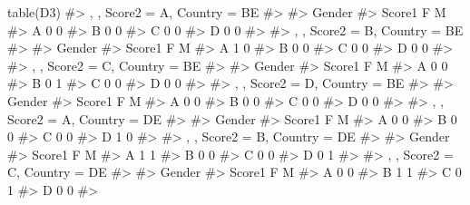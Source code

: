 \documentclass[
  letterpaper,
  DIV=11,
  numbers=noendperiod]{scrreprt}
\newenvironment{Shaded}{\begin{snugshade}}{\end{snugshade}}
\newcommand{\CommentTok}[1]{\textcolor[rgb]{0.37,0.37,0.37}{#1}}
\newcommand{\FunctionTok}[1]{\textcolor[rgb]{0.28,0.35,0.67}{#1}}
\newcommand{\NormalTok}[1]{\textcolor[rgb]{0.00,0.23,0.31}{#1}}
\begin{document}
\begin{Shaded}
\begin{Highlighting}[]
\FunctionTok{table}\NormalTok{(D3)}
\CommentTok{\#\textgreater{} , , Score2 = A, Country = BE}
\CommentTok{\#\textgreater{} }
\CommentTok{\#\textgreater{}       Gender}
\CommentTok{\#\textgreater{} Score1 F M}
\CommentTok{\#\textgreater{}      A 0 0}
\CommentTok{\#\textgreater{}      B 0 0}
\CommentTok{\#\textgreater{}      C 0 0}
\CommentTok{\#\textgreater{}      D 0 0}
\CommentTok{\#\textgreater{} }
\CommentTok{\#\textgreater{} , , Score2 = B, Country = BE}
\CommentTok{\#\textgreater{} }
\CommentTok{\#\textgreater{}       Gender}
\CommentTok{\#\textgreater{} Score1 F M}
\CommentTok{\#\textgreater{}      A 1 0}
\CommentTok{\#\textgreater{}      B 0 0}
\CommentTok{\#\textgreater{}      C 0 0}
\CommentTok{\#\textgreater{}      D 0 0}
\CommentTok{\#\textgreater{} }
\CommentTok{\#\textgreater{} , , Score2 = C, Country = BE}
\CommentTok{\#\textgreater{} }
\CommentTok{\#\textgreater{}       Gender}
\CommentTok{\#\textgreater{} Score1 F M}
\CommentTok{\#\textgreater{}      A 0 0}
\CommentTok{\#\textgreater{}      B 0 1}
\CommentTok{\#\textgreater{}      C 0 0}
\CommentTok{\#\textgreater{}      D 0 0}
\CommentTok{\#\textgreater{} }
\CommentTok{\#\textgreater{} , , Score2 = D, Country = BE}
\CommentTok{\#\textgreater{} }
\CommentTok{\#\textgreater{}       Gender}
\CommentTok{\#\textgreater{} Score1 F M}
\CommentTok{\#\textgreater{}      A 0 0}
\CommentTok{\#\textgreater{}      B 0 0}
\CommentTok{\#\textgreater{}      C 0 0}
\CommentTok{\#\textgreater{}      D 0 0}
\CommentTok{\#\textgreater{} }
\CommentTok{\#\textgreater{} , , Score2 = A, Country = DE}
\CommentTok{\#\textgreater{} }
\CommentTok{\#\textgreater{}       Gender}
\CommentTok{\#\textgreater{} Score1 F M}
\CommentTok{\#\textgreater{}      A 0 0}
\CommentTok{\#\textgreater{}      B 0 0}
\CommentTok{\#\textgreater{}      C 0 0}
\CommentTok{\#\textgreater{}      D 1 0}
\CommentTok{\#\textgreater{} }
\CommentTok{\#\textgreater{} , , Score2 = B, Country = DE}
\CommentTok{\#\textgreater{} }
\CommentTok{\#\textgreater{}       Gender}
\CommentTok{\#\textgreater{} Score1 F M}
\CommentTok{\#\textgreater{}      A 1 1}
\CommentTok{\#\textgreater{}      B 0 0}
\CommentTok{\#\textgreater{}      C 0 0}
\CommentTok{\#\textgreater{}      D 0 1}
\CommentTok{\#\textgreater{} }
\CommentTok{\#\textgreater{} , , Score2 = C, Country = DE}
\CommentTok{\#\textgreater{} }
\CommentTok{\#\textgreater{}       Gender}
\CommentTok{\#\textgreater{} Score1 F M}
\CommentTok{\#\textgreater{}      A 0 0}
\CommentTok{\#\textgreater{}      B 1 1}
\CommentTok{\#\textgreater{}      C 0 1}
\CommentTok{\#\textgreater{}      D 0 0}
\CommentTok{\#\textgreater{} }

\end{Highlighting}
\end{Shaded}
\end{document}
